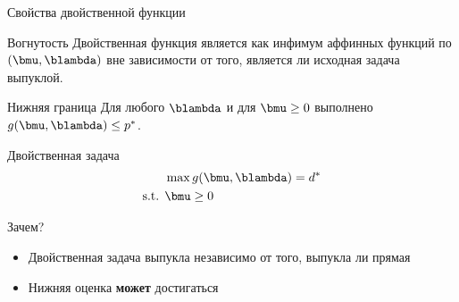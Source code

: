 \documentclass[12pt]{beamer}
\begin{document}
\begin{frame}{Свойства двойственной функции}
\small
\begin{block}{Вогнутость}
Двойственная функция является {\color{red}{вогнутой}} как инфимум аффинных функций по $(\bmu, \blambda)$ вне зависимости от того, является ли исходная задача выпуклой.
\end{block}

\begin{block}{Нижняя граница}
Для любого $\blambda$ и для $\bmu \geq 0$ выполнено $g(\bmu, \blambda) \leq p^*$.
\end{block}

\begin{block}{Двойственная задача}
\vspace{-5mm}
\begin{equation*}
\begin{split}
& \max g(\bmu, \blambda) = d^*\\
\text{s.t. } & \bmu \geq 0
\end{split}
\end{equation*}
\end{block}

\begin{block}{Зачем?}
\begin{itemize}
\vspace{-2mm}
\item Двойственная задача выпукла независимо от того, выпукла ли прямая
\vspace{-3mm}
\item Нижняя оценка \textbf{может} достигаться
\end{itemize}
\end{block}
\end{frame}

\end{document}
